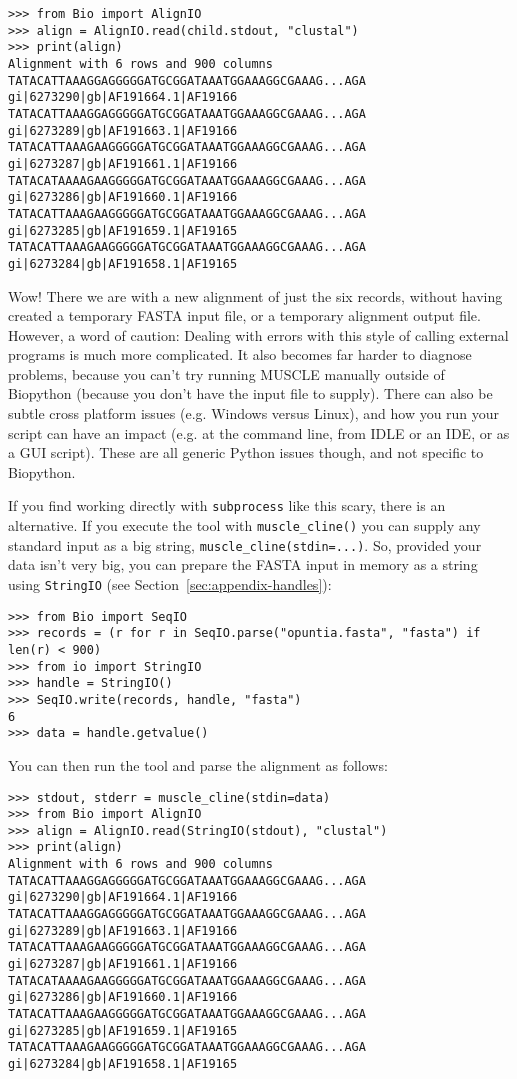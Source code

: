 \begin{verbatim}
>>> from Bio import AlignIO
>>> align = AlignIO.read(child.stdout, "clustal")
>>> print(align)
Alignment with 6 rows and 900 columns
TATACATTAAAGGAGGGGGATGCGGATAAATGGAAAGGCGAAAG...AGA gi|6273290|gb|AF191664.1|AF19166
TATACATTAAAGGAGGGGGATGCGGATAAATGGAAAGGCGAAAG...AGA gi|6273289|gb|AF191663.1|AF19166
TATACATTAAAGAAGGGGGATGCGGATAAATGGAAAGGCGAAAG...AGA gi|6273287|gb|AF191661.1|AF19166
TATACATAAAAGAAGGGGGATGCGGATAAATGGAAAGGCGAAAG...AGA gi|6273286|gb|AF191660.1|AF19166
TATACATTAAAGAAGGGGGATGCGGATAAATGGAAAGGCGAAAG...AGA gi|6273285|gb|AF191659.1|AF19165
TATACATTAAAGAAGGGGGATGCGGATAAATGGAAAGGCGAAAG...AGA gi|6273284|gb|AF191658.1|AF19165
\end{verbatim}

Wow! There we are with a new alignment of just the six records, without having created
a temporary FASTA input file, or a temporary alignment output file. However, a word of
caution: Dealing with errors with this style of calling external programs is much more
complicated.
It also becomes far harder to diagnose problems, because you can't try running MUSCLE
manually outside of Biopython (because you don't have the input file to supply).
There can also be subtle cross platform issues (e.g. Windows versus Linux), and how
you run your script can have an impact (e.g. at the command line, from IDLE or an
IDE, or as a GUI script). These are all generic Python issues though, and not
specific to Biopython.

If you find working directly with \texttt{subprocess} like this scary, there is an
alternative. If you execute the tool with \texttt{muscle\_cline()} you can supply
any standard input as a big string, \texttt{muscle\_cline(stdin=...)}. So,
provided your data isn't very big, you can prepare the FASTA input in memory as
a string using \texttt{StringIO} (see Section~\ref{sec:appendix-handles}):

\begin{verbatim}
>>> from Bio import SeqIO
>>> records = (r for r in SeqIO.parse("opuntia.fasta", "fasta") if len(r) < 900)
>>> from io import StringIO
>>> handle = StringIO()
>>> SeqIO.write(records, handle, "fasta")
6
>>> data = handle.getvalue()
\end{verbatim}

\noindent You can then run the tool and parse the alignment as follows:

\begin{verbatim}
>>> stdout, stderr = muscle_cline(stdin=data)
>>> from Bio import AlignIO
>>> align = AlignIO.read(StringIO(stdout), "clustal")
>>> print(align)
Alignment with 6 rows and 900 columns
TATACATTAAAGGAGGGGGATGCGGATAAATGGAAAGGCGAAAG...AGA gi|6273290|gb|AF191664.1|AF19166
TATACATTAAAGGAGGGGGATGCGGATAAATGGAAAGGCGAAAG...AGA gi|6273289|gb|AF191663.1|AF19166
TATACATTAAAGAAGGGGGATGCGGATAAATGGAAAGGCGAAAG...AGA gi|6273287|gb|AF191661.1|AF19166
TATACATAAAAGAAGGGGGATGCGGATAAATGGAAAGGCGAAAG...AGA gi|6273286|gb|AF191660.1|AF19166
TATACATTAAAGAAGGGGGATGCGGATAAATGGAAAGGCGAAAG...AGA gi|6273285|gb|AF191659.1|AF19165
TATACATTAAAGAAGGGGGATGCGGATAAATGGAAAGGCGAAAG...AGA gi|6273284|gb|AF191658.1|AF19165
\end{verbatim}

